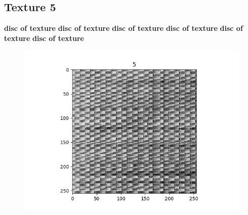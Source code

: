 \documentclass{article}
\begin{document}
\subsection{Texture 5}
\textbf{disc of texture}
\textbf{disc of texture}
\textbf{disc of texture}
\textbf{disc of texture}
\textbf{disc of texture}
\textbf{disc of texture}
\begin{figure}[h!]
\includegraphics[scale=0.5]{5.png}
\end{figure}
\end{document}
